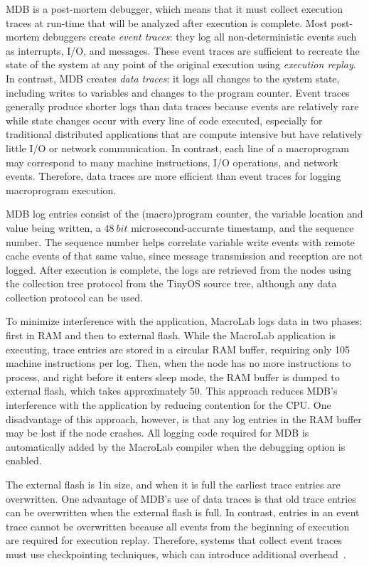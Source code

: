 MDB is a post-mortem debugger, which means that it must collect execution traces
at run-time that will be analyzed after execution is complete.  Most post-mortem
debuggers create \emph{event traces}: they log all non-deterministic events such
as interrupts, I/O, and messages.  These event traces are sufficient to recreate
the state of the system at any point of the original execution using
\emph{execution replay}.  In contrast, MDB creates \emph{data traces}: it logs
all changes to the system state, including writes to variables and changes to
the program counter.  Event traces generally produce shorter logs than data
traces because events are relatively rare while state changes occur with every
line of code executed, especially for traditional distributed applications that
are compute intensive but have relatively little I/O or network communication.
In contrast, each line of a macroprogram may correspond to many machine
instructions, I/O operations, and network events.  Therefore, data traces are
more efficient than event traces for logging macroprogram execution.

MDB log entries consist of the (macro)program counter, the variable location and
value being written, a $48 \ bit$ microsecond-accurate timestamp, and the
sequence number.  The sequence number helps correlate variable write events
with remote cache events of that same value, since message transmission and
reception are not logged.  After execution is complete, the logs are retrieved
from the nodes using the collection tree protocol from the TinyOS source tree,
although any data collection protocol can be used.

To minimize interference with the application, MacroLab logs data in two phases:
first in RAM and then to external flash. While the MacroLab application is
executing, trace entries are stored in a circular RAM buffer, requiring only 105
machine instructions per log.  Then, when the node has no more instructions to
process, and right before it enters sleep mode, the RAM buffer is dumped to
external flash, which takes approximately 50\ms.  This approach reduces MDB's
interference with the application by reducing contention for the CPU\@.  One
disadvantage of this approach, however, is that any log entries in the RAM
buffer may be lost if the node crashes.  All logging code required for MDB is
automatically added by the MacroLab compiler when the debugging option is
enabled.

The external flash is 1\mb in size, and when it is full the earliest trace
entries are overwritten.  One advantage of MDB's use of data traces is that old
trace entries can be overwritten when the external flash is full.  In contrast,
entries in an event trace cannot be overwritten because all events from the
beginning of execution are required for execution replay.  Therefore, systems
that collect event traces must use checkpointing techniques, which can introduce
additional overhead~\cite{Wittie1986}.

